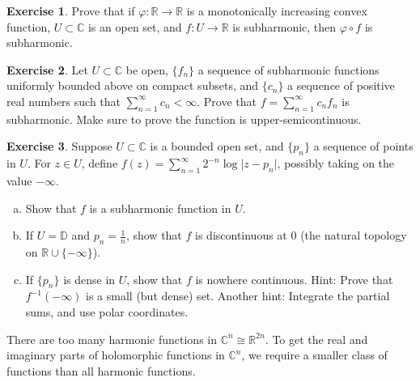 \documentclass[12pt,openany]{book}
\newcommand{\sabs}[1]{\lvert {#1} \rvert}
\newcommand{\C}{{\mathbb{C}}}
\newcommand{\R}{{\mathbb{R}}}
\newcommand{\D}{{\mathbb{D}}}
\theoremstyle{plain}
\theoremstyle{remark}
\theoremstyle{definition}
\newenvironment{exbox}{%
    \def\FrameCommand{\vrule width 1pt \relax\hspace {10pt}}%
    \MakeFramed {\advance \hsize -\width \FrameRestore }%
}{%
    \endMakeFramed
}
\newenvironment{exparts}{%
    \leavevmode\begin{enumerate}[a),noitemsep,topsep=0pt,parsep=0pt,partopsep=0pt]
}{%
    \end{enumerate}
}
\theoremstyle{exercise}
\newtheorem{exercise}{Exercise}[section]
\theoremstyle{example}
\begin{document}
\begin{exbox}
\begin{exercise}
Prove that if $\varphi \colon \R \to \R$ is a monotonically increasing
convex function, $U \subset \C$ is an open set, and $f \colon U \to \R$
is subharmonic, then $\varphi \circ f$ is subharmonic.
\end{exercise}

\begin{exercise}
Let $U \subset \C$ be open, $\{ f_n \}$ a sequence of 
subharmonic functions uniformly bounded above on compact subsets, and 
$\{ c_n \}$ a sequence of positive real numbers such that
$\sum_{n=1}^\infty c_n < \infty$.
Prove that $f = \sum_{n=1}^\infty c_n f_n$ is subharmonic.  Make sure to prove
the function is upper-semicontinuous.
\end{exercise}

\begin{exercise}
\pagebreak[2]
Suppose $U \subset \C$ is a bounded open set, and $\{ p_n \}$ a sequence of points in
$U$. For $z \in U$, define
$f(z) = \sum_{n=1}^\infty 2^{-n} \log \sabs{z-p_n}$, possibly taking on the
value $-\infty$.
\begin{exparts}
\item
Show that $f$ is a subharmonic function in $U$.
\item
If $U = \D$ and $p_n = \frac{1}{n}$, show that $f$ is discontinuous at 0
(the natural topology on $\R \cup \{ -\infty \}$).
\item
If $\{ p_n \}$ is dense in $U$, show that $f$ 
is nowhere continuous.
Hint: Prove that $f^{-1}(-\infty)$ is a small (but dense) set.  Another
hint: Integrate the partial sums, and use polar coordinates.
\pagebreak[2]
\end{exparts}
\end{exercise}
\end{exbox}

There are too many
harmonic functions in $\C^n \cong \R^{2n}$.  To get the real and imaginary parts of
holomorphic functions in $\C^n$,
we require a smaller class of functions than all harmonic functions.
\end{document}
